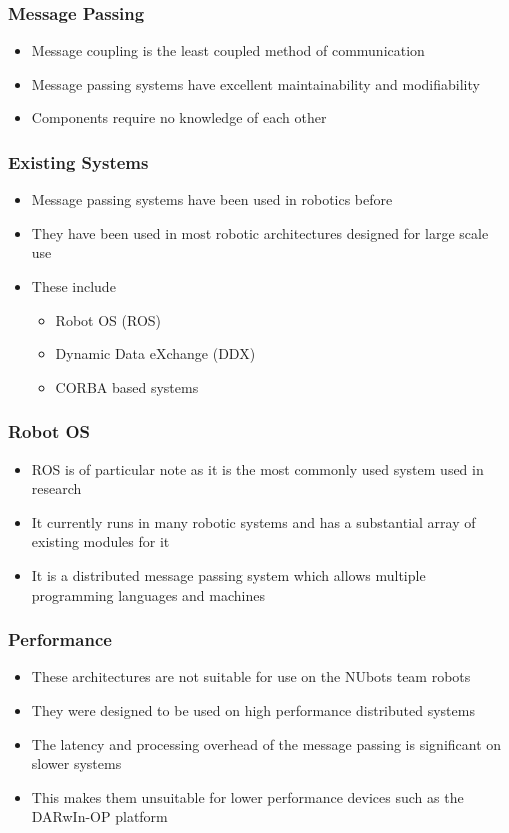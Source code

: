 \documentclass{beamer}
\begin{document}
\begin{frame}
	\frametitle{Message Passing}
	\begin{itemize}
		\item Message coupling is the least coupled method of communication
		\item Message passing systems have excellent maintainability and modifiability
		\item Components require no knowledge of each other
	\end{itemize}
\end{frame}

\begin{frame}
	\frametitle{Existing Systems}
	\begin{itemize}
		\item Message passing systems have been used in robotics before
		\item They have been used in most robotic architectures designed for large scale use
		\item These include
		\begin{itemize}
			\item Robot OS (ROS)
			\item Dynamic Data eXchange (DDX)
			\item CORBA based systems
		\end{itemize}
	\end{itemize}
\end{frame}

\begin{frame}
	\frametitle{Robot OS}
	\begin{itemize}
		\item ROS is of particular note as it is the most commonly used system used in research
		\item It currently runs in many robotic systems and has a substantial array of existing modules for it
		\item It is a distributed message passing system which allows multiple programming languages and machines
	\end{itemize}
\end{frame}

\begin{frame}
	\frametitle{Performance}
	\begin{itemize}
		\item These architectures are not suitable for use on the NUbots team robots
		\item They were designed to be used on high performance distributed systems
		\item The latency and processing overhead of the message passing is significant on slower systems
		\item This makes them unsuitable for lower performance devices such as the DARwIn-OP platform
	\end{itemize}
\end{frame}
\end{document}
